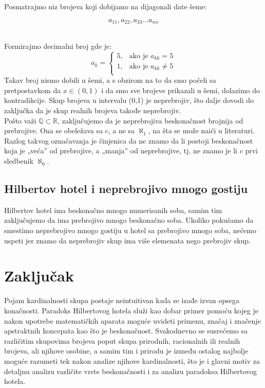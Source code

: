 \documentclass[a4paper]{article}
\begin{document}
\newline
Posmatrajmo niz brojeva koji dobijamo na dijagonali date šeme:

$$a_{11},a_{22},a_{33} \ldots a_{nn}$$\\

\par 
Formirajmo decimalni broj gde je:
$$
a_{k} = \left\{\begin{array}{lr}
        5, & \text{ako je } a_{kk} = 5\\
        1, & \text{ako je } a_{kk} \not= 5\\
        \end{array} 
$$
\newline
Takav broj nismo dobili u šemi, a s obzirom na to da smo počeli sa pretpostavkom da $x\in(0,1)$ i da smo sve brojeve prikazali u šemi, dolazimo do kontradikcije. Skup brojeva u intervalu (0,1) je neprebrojiv, što dalje dovodi do zaključka da je skup realnih brojeva takođe neprebrojiv.\\

\newline
Pošto važi $\mathbb{Q}\subset \mathbb{R}$, zaključujemo da je neprebrojiva beskonačnost brojnija od prebrojive. Ona se obeležava sa $c$, a ne sa $\aleph_{1}$, na šta se može naići u literaturi. Razlog takvog označavanja je činjenica da ne znamo da li postoji beskonačnost koja je „veća” od prebrojive, a „manja” od neprebrojive, tj. ne znamo je li $c$ prvi sledbenik $\aleph_{0}$.\\
\subsection{Hilbertov hotel i neprebrojivo mnogo gostiju}
Hilbertov hotel ima beskonačno mnogo numerisanih soba, samim tim zaključujemo da ima prebrojivo mnogo beskonačno soba. Ukoliko pokušamo da smestimo neprebrojivo mnogo gostiju u hotel sa prebrojivo mnogo soba, nećemo uspeti jer znamo da neprebrojiv skup ima više elemenata nego prebrojiv skup.

\section{Zaključak}
\label{poglavlje:Zaključak}
Pojam kardinalnosti skupa postaje neintuitivan kada se izađe izvan opsega konačnosti. Paradoks Hilbertovog hotela služi kao dobar primer pomoću kojeg je nakon upotrebe matematičkih aparata moguće uvideti primenu, značaj i značenje apstraktnih koncepata kao što je beskonačnost. Svakodnevno se susrećemo sa različitim skupovima brojeva poput skupa prirodnih, racionalnih ili realnih brojeva, ali njihove osobine, a samim tim i prirodu je između ostalog najbolje moguće razumeti tek nakon analize njihove kardinalnosti, što je i glavni motiv za detaljnu analizu različite vrste beskonačnosti i za analizu paradoksa Hilbertovog hotela.

\newpage


\renewcommand{\refname}{Literatura}


\end{document}
